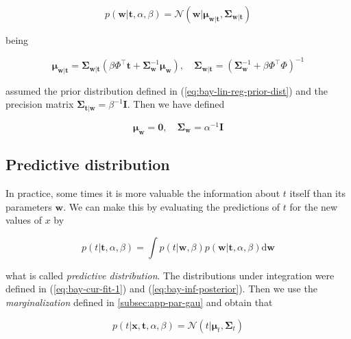 \documentclass[11pt]{article} %
\begin{document}
 \begin{equation}
   \label{eq:bay-inf-posterior}
    p(\mathbf{w}|\mathbf{t},\alpha,\beta) = \mathcal{N} \left( \mathbf{w} | \boldsymbol{\mu}_{\mathbf{w}|\mathbf{t}} , \boldsymbol{\Sigma}_{\mathbf{w}|\mathbf{t}}\right)
 \end{equation}

 being

 \begin{equation}
   \boldsymbol{\mu}_{\mathbf{w}|\mathbf{t}}=\boldsymbol{\Sigma}_{\mathbf{w}|\mathbf{t}}\left(\beta \Phi^\top \mathbf{t}+\boldsymbol{\Sigma}_{\mathbf{w}}^{-1} \boldsymbol{\mu}_{\mathbf{w}}\right), \quad \boldsymbol{\Sigma}_{\mathbf{w}|\mathbf{t}}=\left(\boldsymbol{\Sigma}_{\mathbf{w}}^{-1}+ \beta \Phi^\top \Phi\right)^{-1}
 \end{equation}

 assumed the prior distribution defined in (\ref{eq:bay-lin-reg-prior-dist}) and the precision matrix $\boldsymbol{\Sigma}_{\mathbf{t}|\mathbf{w}} = \beta^{-1}\mathbf{I}$. Then we have defined

 \begin{equation}
    \boldsymbol{\mu}_\mathbf{w}=\mathbf{0}, \quad \boldsymbol{\Sigma}_\mathbf{w} = \alpha^{-1} \mathbf{I}
 \end{equation}

\subsection{Predictive distribution}

In practice, some times it is more valuable the information about $t$ itself than its parameters $\mathbf{w}$. We can make this by evaluating the predictions of $t$ for the new values of $x$ by

\begin{equation}
   p(t | \mathbf{t}, \alpha, \beta)=\int p(t | \mathbf{w}, \beta) p(\mathbf{w} | \mathbf{t}, \alpha, \beta) \mathrm{d} \mathbf{w}
\end{equation}

what is called \textit{predictive distribution}. The distributions under integration were defined in (\ref{eq:bay-cur-fit-1}) and (\ref{eq:bay-inf-posterior}). Then we use the \textit{marginalization} defined in \autoref{subsec:app-par-gau} and obtain that

\begin{equation}
   p(t | \mathbf{x}, \mathbf{t}, \alpha, \beta)=\mathcal{N}\left(t | \boldsymbol{\mu}_{t}, \boldsymbol{\Sigma}_{t} \right)
\end{equation}
\end{document}
